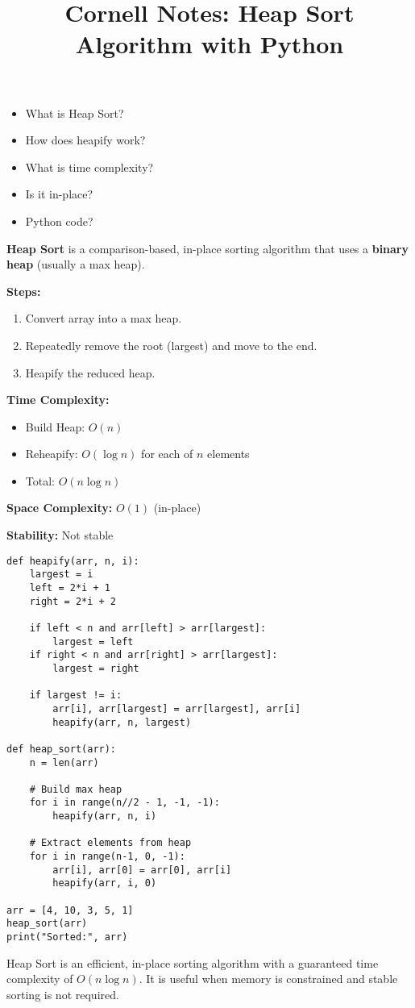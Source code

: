 \documentclass[12pt]{article}
\title{\textbf{Cornell Notes: Heap Sort Algorithm with Python}}
\date{}
\author{}
\begin{document}
\maketitle

\begin{cornellbox}
\begin{itemize}
  \item What is Heap Sort?
  \item How does heapify work?
  \item What is time complexity?
  \item Is it in-place?
  \item Python code?
\end{itemize}
\end{cornellbox}

\begin{cornellbox}[Notes]
\textbf{Heap Sort} is a comparison-based, in-place sorting algorithm that uses a \textbf{binary heap} (usually a max heap).

\textbf{Steps:}
\begin{enumerate}
  \item Convert array into a max heap.
  \item Repeatedly remove the root (largest) and move to the end.
  \item Heapify the reduced heap.
\end{enumerate}

\textbf{Time Complexity:}
\begin{itemize}
  \item Build Heap: \( O(n) \)
  \item Reheapify: \( O(\log n) \) for each of \( n \) elements
  \item Total: \( O(n \log n) \)
\end{itemize}

\textbf{Space Complexity:} \( O(1) \) (in-place)

\textbf{Stability:} Not stable
\end{cornellbox}

\begin{cornellbox}
\begin{lstlisting}[style=mypython, caption={Heap Sort in Python}]
def heapify(arr, n, i):
    largest = i
    left = 2*i + 1
    right = 2*i + 2

    if left < n and arr[left] > arr[largest]:
        largest = left
    if right < n and arr[right] > arr[largest]:
        largest = right

    if largest != i:
        arr[i], arr[largest] = arr[largest], arr[i]
        heapify(arr, n, largest)

def heap_sort(arr):
    n = len(arr)

    # Build max heap
    for i in range(n//2 - 1, -1, -1):
        heapify(arr, n, i)

    # Extract elements from heap
    for i in range(n-1, 0, -1):
        arr[i], arr[0] = arr[0], arr[i]
        heapify(arr, i, 0)

arr = [4, 10, 3, 5, 1]
heap_sort(arr)
print("Sorted:", arr)
\end{lstlisting}
\end{cornellbox}

\begin{cornellbox}[Summary]
Heap Sort is an efficient, in-place sorting algorithm with a guaranteed time complexity of \( O(n \log n) \). It is useful when memory is constrained and stable sorting is not required.
\end{cornellbox}
\end{document}
